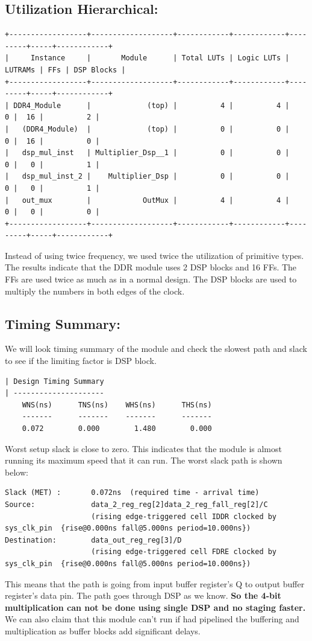 \documentclass{report}
\begin{document}
\subsection{Utilization Hierarchical:}
\begin{verbatim}
+------------------+-------------------+------------+------------+---------+-----+------------+
|     Instance     |       Module      | Total LUTs | Logic LUTs | LUTRAMs | FFs | DSP Blocks |
+------------------+-------------------+------------+------------+---------+-----+------------+
| DDR4_Module      |             (top) |          4 |          4 |       0 |  16 |          2 |
|   (DDR4_Module)  |             (top) |          0 |          0 |       0 |  16 |          0 |
|   dsp_mul_inst   | Multiplier_Dsp__1 |          0 |          0 |       0 |   0 |          1 |
|   dsp_mul_inst_2 |    Multiplier_Dsp |          0 |          0 |       0 |   0 |          1 |
|   out_mux        |            OutMux |          4 |          4 |       0 |   0 |          0 |
+------------------+-------------------+------------+------------+---------+-----+------------+
\end{verbatim}
Instead of using twice frequency, we used twice the utilization of primitive types. The results indicate that the DDR module uses 2 DSP blocks and 16 FFs. The FFs are used twice as much as in a normal design. The DSP blocks are used to multiply the numbers in both edges of the clock.

\subsection{Timing Summary:}
We will look timing summary of the module and check the slowest path and slack to see if the limiting factor is DSP block.

\begin{verbatim}
| Design Timing Summary
| ---------------------
    WNS(ns)      TNS(ns)    WHS(ns)      THS(ns)
    -------      -------    -------      -------
    0.072        0.000        1.480        0.000
\end{verbatim}
Worst setup slack is close to zero. This indicates that the module is almost running its maximum speed that it can run.
The worst slack path is shown below:
\begin{verbatim}
Slack (MET) :       0.072ns  (required time - arrival time)
Source:             data_2_reg_reg[2]data_2_reg_fall_reg[2]/C
                    (rising edge-triggered cell IDDR clocked by sys_clk_pin  {rise@0.000ns fall@5.000ns period=10.000ns})
Destination:        data_out_reg_reg[3]/D
                    (rising edge-triggered cell FDRE clocked by sys_clk_pin  {rise@0.000ns fall@5.000ns period=10.000ns})
\end{verbatim}
This means that the path is going from input buffer register's Q to output buffer register's data pin. The path goes through DSP as we know. \textbf{So the 4-bit multiplication can not be done using single DSP  and no staging faster.} We can also claim that this module can't run if had pipelined the buffering and multiplication as buffer blocks add significant delays.
\end{document}
